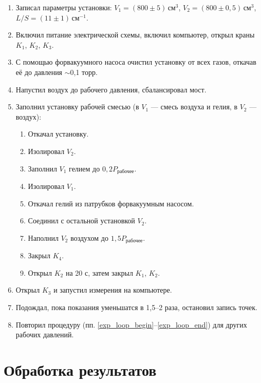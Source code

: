 \documentclass[12pt]{article}
\begin{document}
	\begin{enumerate}
		\item Записал параметры установки: $V_1=(800\pm 5) \,\text{см}^3$, $V_2=(800\pm 0{,}5) \,\text{см}^3$, $L/S=(11\pm 1) \,\text{см}^{-1}$.
		\item Включил питание электрической схемы, включил компьютер, открыл краны $K_1$, $K_2$, $K_3$.
		\item С помощью форвакуумного насоса очистил установку от всех газов, откачав её до давления $\sim$0,1 торр. \label{exp_loop_begin}
		\item Напустил воздух до рабочего давления, сбалансировал мост.
		\item Заполнил установку рабочей смесью (в $V_1$ --- смесь воздуха и гелия, в $V_2$ --- воздух):
		\begin{enumerate}
			\item Откачал установку.
			\item Изолировал $V_2$.
			\item Заполнил $V_1$ гелием до $0{,}2P_\text{рабочее}$.
			\item Изолировал $V_1$.
			\item Откачал гелий из патрубков форвакуумным насосом.
			\item Соединил с остальной установкой $V_2$.
			\item Наполнил $V_2$ воздухом до $1{,}5P_\text{рабочее}$.
			\item Закрыл $K_4$.
			\item Открыл $K_2$ на 20 с, затем закрыл $K_1$, $K_2$.
		\end{enumerate}
		\item Открыл $K_3$ и запустил измерения на компьютере.
		\item Подождал, пока показания уменьшатся в 1,5--2 раза, остановил запись точек. \label{exp_loop_end}
		\item Повторил процедуру (пп. \ref{exp_loop_begin}--\ref{exp_loop_end}) для других рабочих давлений.
	\end{enumerate}
	
	\section*{Обработка результатов}
	
\end{document}
